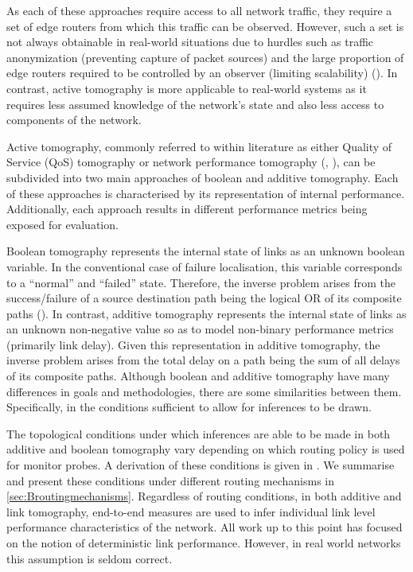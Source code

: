 As each of these approaches require access to all network traffic, they require a set of edge routers from which this traffic can be observed. However, such a set is not always obtainable in real-world situations due to hurdles such as traffic anonymization (preventing capture of packet sources) and the large proportion of edge routers required to be controlled by an observer (limiting scalability) (\cite{leung_measurement-based_2002}). In contrast, active tomography is more applicable to real-world systems as it requires less assumed knowledge of the network's state and also less access to components of the network.\par
Active tomography, commonly referred to within literature as either Quality of Service (QoS) tomography or network performance tomography (\cite{lawrence_network_2006}, \cite{barnes_stochastic_2020}), can be subdivided into two main approaches of boolean and additive tomography. Each of these approaches is characterised by its representation of internal performance. Additionally, each approach results in different performance metrics being exposed for evaluation.\par
Boolean tomography represents the internal state of links as an unknown boolean variable. In the conventional case of failure localisation, this variable corresponds to a “normal” and “failed” state. Therefore, the inverse problem arises from the success/failure of a source destination path being the logical OR of its composite paths (\cite{duffield_network_2006}). In contrast, additive tomography represents the internal state of links as an unknown non-negative value so as to model non-binary performance metrics (primarily link delay). Given this representation in additive tomography, the inverse problem arises from the total delay on a path being the sum of all delays of its composite paths. Although boolean and additive tomography have many differences in goals and methodologies, there are some similarities between them. Specifically, in the conditions sufficient to allow for inferences to be drawn. \par
The topological conditions under which inferences are able to be made in both additive and boolean tomography vary depending on which routing policy is used for monitor probes. A derivation of these conditions is given in \cite{he_network_2021}. We summarise and present these conditions under different routing mechanisms in \cref{sec:Broutingmechanisms}. Regardless of routing conditions, in both additive and link tomography, end-to-end measures are used to infer individual link level performance characteristics of the network. All work up to this point has focused on the notion of deterministic link performance. However, in real world networks this assumption is seldom correct.\par
